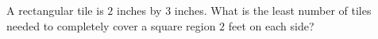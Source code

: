 A rectangular tile is $2$ inches by $3$ inches. What is the least number of tiles needed to completely cover a square region $2$ feet on each side?
